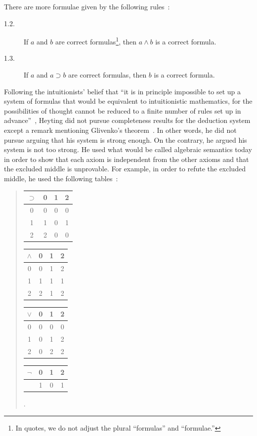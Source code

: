 There are more formulae given by the following rules~\cite{heyting1930}:
\begin{description}
 \item[1.2.] If $a$ and $b$ are correct formulas\footnote{In quotes, we do not adjust the plural
      ``formulas'' and ``formulae.'' }, then $a\land b$ is a correct
       formula.
 \item[1.3.] If $a$ and $a\supset b$ are correct formulas, then $b$ is a correct formula.
\end{description}

Following the intuitionists' belief
that ``it is in principle impossible to set up a system of formulas that
would be equivalent to intuitionistic mathematics, for the
possibilities of thought cannot be reduced to a finite number of rules
set up in advance''~\citep{heyting1930}, Heyting did not pursue completeness
results for the deduction system
except a remark mentioning Glivenko's
theorem~\citep{glivenko0,glivenko1}.
In other words, he did not pursue arguing that his system is strong
enough.
On the contrary, he argued his system is not too strong.
He used what would be called algebraic semantics today
in order to show that
each axiom is independent from the other axioms and that
the excluded middle is unprovable.
For example, in order to refute the excluded middle, he used the
following tables~\citep{heyting1930}:\\
 \begin{quotation}
 \begin{center}
  \begin{tabular}{c|ccc}
   $\supset $& 0  & 1  & 2 \\ \hline
   0 & 0 & 0 & 0 \\
   1 & 1 & 0 & 1 \\
   2 & 2 & 0 & 0
  \end{tabular}
  \hfill
  \begin{tabular}{c|ccc}
   $\wedge $& 0 & 1& 2\\ \hline
   0 & 0 & 1 & 2\\
   1 & 1 & 1 & 1\\
   2 & 2 & 1 & 2\\
  \end{tabular}
  \hfill
  \begin{tabular}{c|ccc}
   $\vee$& 0 & 1 & 2\\ \hline
   0 & 0 & 0 & 0 \\
   1 & 0 & 1 & 2 \\
   2 & 0 & 2 & 2\\
  \end{tabular}
  \hfill
  \begin{tabular}{c|ccc}
   $\neg $& 0 & 1 & 2\\ \hline
   & 1 & 0 & 1\\
  \end{tabular}\enspace.
 \end{center}
 \end{quotation}
